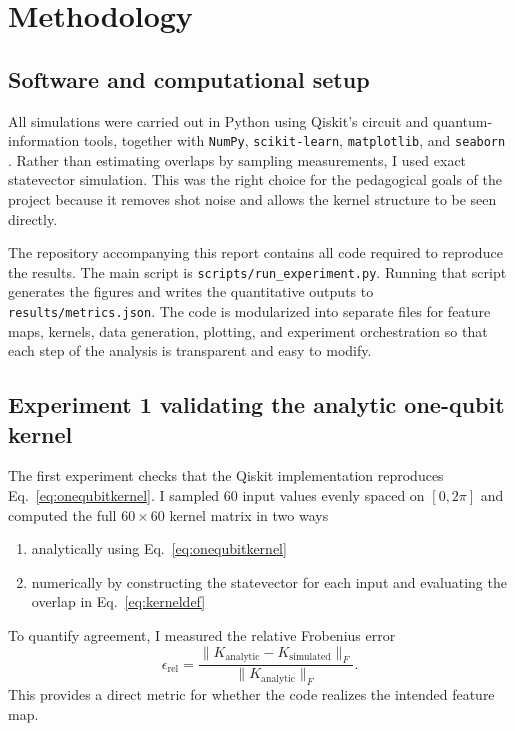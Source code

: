 \documentclass[11pt]{article}
\begin{document}
\section{Methodology}

\subsection{Software and computational setup}

All simulations were carried out in Python using Qiskit's circuit and quantum-information tools, together with \texttt{NumPy}, \texttt{scikit-learn}, \texttt{matplotlib}, and \texttt{seaborn} \cite{qiskitdocs, qiskitkerneldocs, sklearn}. Rather than estimating overlaps by sampling measurements, I used exact statevector simulation. This was the right choice for the pedagogical goals of the project because it removes shot noise and allows the kernel structure to be seen directly.

The repository accompanying this report contains all code required to reproduce the results. The main script is \texttt{scripts/run\_experiment.py}. Running that script generates the figures and writes the quantitative outputs to \texttt{results/metrics.json}. The code is modularized into separate files for feature maps, kernels, data generation, plotting, and experiment orchestration so that each step of the analysis is transparent and easy to modify.

\subsection{Experiment 1 validating the analytic one-qubit kernel}

The first experiment checks that the Qiskit implementation reproduces Eq.~\eqref{eq:onequbitkernel}. I sampled $60$ input values evenly spaced on $[0,2\pi]$ and computed the full $60\times 60$ kernel matrix in two ways
\begin{enumerate}[label=\arabic*.]
\item analytically using Eq.~\eqref{eq:onequbitkernel}
\item numerically by constructing the statevector for each input and evaluating the overlap in Eq.~\eqref{eq:kerneldef}
\end{enumerate}

To quantify agreement, I measured the relative Frobenius error
\begin{equation}
\epsilon_{\mathrm{rel}}
=
\frac{\|K_{\mathrm{analytic}}-K_{\mathrm{simulated}}\|_F}
{\|K_{\mathrm{analytic}}\|_F}.
\label{eq:frob}
\end{equation}
This provides a direct metric for whether the code realizes the intended feature map.
\end{document}
